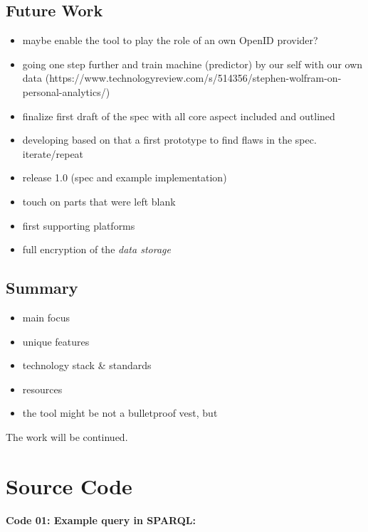 \documentclass[12pt,english,a4paper,titlepage,cleardoublepage=empty,dottedtoc]{report}
\providecommand{\tightlist}{%
  \setlength{\itemsep}{0pt}\setlength{\parskip}{0pt}}
\begin{document}
\section{Future Work}\label{future-work}

\begin{itemize}
\item
  maybe enable the tool to play the role of an own OpenID provider?
\item
  going one step further and train machine (predictor) by our self with
  our own data
  (https://www.technologyreview.com/s/514356/stephen-wolfram-on-personal-analytics/)
\item
  finalize first draft of the spec with all core aspect included and
  outlined
\item
  developing based on that a first prototype to find flaws in the spec.
  iterate/repeat
\item
  release 1.0 (spec and example implementation)
\item
  touch on parts that were left blank
\item
  first supporting platforms
\item
  full encryption of the \emph{data storage}
\end{itemize}

\section{Summary}\label{summary}

\begin{itemize}
\tightlist
\item
  main focus
\item
  unique features
\item
  technology stack \& standards
\item
  resources
\item
  the tool might be not a bulletproof vest, but
\end{itemize}

The work will be continued.

\chapter*{Source Code}\label{source-code}

 \setcounter{page}{6} \pagestyle{plain}

\textbf{\protect\hypertarget{code-01_sparql-query}{}{Code 01: Example
query in SPARQL}:}
\end{document}
